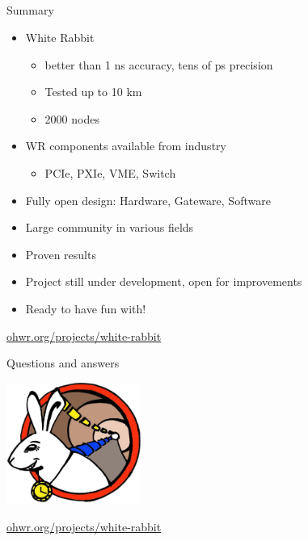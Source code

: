 \documentclass[compress,red]{beamer}
\begin{document}
\subsection{}
\begin{frame}{Summary}


    \begin{itemize}
      \item White Rabbit
      \begin{itemize}
	\item better than 1 ns accuracy, tens of ps precision
	\item Tested up to 10 km
	\item 2000 nodes
      \end{itemize}
      \item WR components available from industry
      \begin{itemize}
	\item PCIe, PXIe, VME, Switch
      \end{itemize}
      \item Fully open design: Hardware, Gateware, Software
      \item Large community in various fields
      \item Proven results
      \item Project still under development, open for improvements
      \item Ready to have fun with!
    \end{itemize}    

\begin{center}
\href{http://ohwr.org/projects/white-rabbit}{ohwr.org/projects/white-rabbit}
\end{center}

 
\end{frame}
\begin{frame}{Questions and answers}

    \begin{center}
    \includegraphics[height=4.0cm]{../../figures/logo/WRlogo.jpg}
    \end{center}

\begin{center}
\href{http://ohwr.org/projects/white-rabbit}{ohwr.org/projects/white-rabbit}
\end{center}
\end{frame}
\end{document}
